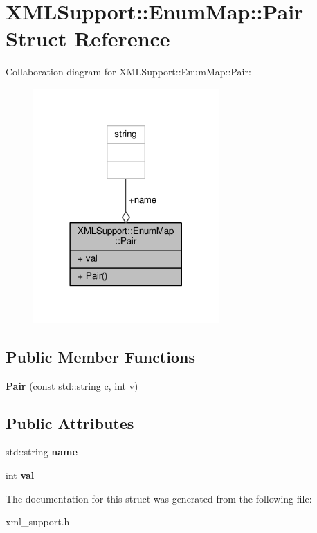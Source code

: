 \hypertarget{structXMLSupport_1_1EnumMap_1_1Pair}{}\section{X\+M\+L\+Support\+:\+:Enum\+Map\+:\+:Pair Struct Reference}
\label{structXMLSupport_1_1EnumMap_1_1Pair}


Collaboration diagram for X\+M\+L\+Support\+:\+:Enum\+Map\+:\+:Pair\+:
\nopagebreak
\begin{figure}[H]
\begin{center}
\leavevmode
\includegraphics[width=201pt]{d1/d5c/structXMLSupport_1_1EnumMap_1_1Pair__coll__graph}
\end{center}
\end{figure}
\subsection*{Public Member Functions}
\begin{DoxyCompactItemize}
\item 
{\bfseries Pair} (const std\+::string c, int v)\hypertarget{structXMLSupport_1_1EnumMap_1_1Pair_af0340eae1faeb23c0a74a8d49da11863}{}\label{structXMLSupport_1_1EnumMap_1_1Pair_af0340eae1faeb23c0a74a8d49da11863}

\end{DoxyCompactItemize}
\subsection*{Public Attributes}
\begin{DoxyCompactItemize}
\item 
std\+::string {\bfseries name}\hypertarget{structXMLSupport_1_1EnumMap_1_1Pair_a1679cc363d5c8459e933d7d3b9ae0772}{}\label{structXMLSupport_1_1EnumMap_1_1Pair_a1679cc363d5c8459e933d7d3b9ae0772}

\item 
int {\bfseries val}\hypertarget{structXMLSupport_1_1EnumMap_1_1Pair_aacdadef8d873eacd62767c17279b5566}{}\label{structXMLSupport_1_1EnumMap_1_1Pair_aacdadef8d873eacd62767c17279b5566}

\end{DoxyCompactItemize}


The documentation for this struct was generated from the following file\+:\begin{DoxyCompactItemize}
\item 
xml\+\_\+support.\+h\end{DoxyCompactItemize}
